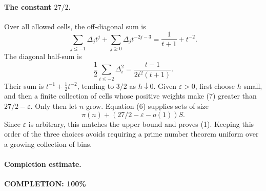 \paragraph{The constant \(27/2\).}
Over all allowed cells, the off-diagonal sum is
\[
 \sum_{j\leq-1}\Delta_j t^j+
 \sum_{j\geq0}\Delta_j t^{-2j-3}
 =\frac1{t+1}+t^{-2}.
\]
The diagonal half-sum is
\[
 \frac12\sum_{i\leq-2}\Delta_i^2
 =\frac{t-1}{2t^2(t+1)}.
\]
Their sum is \(t^{-1}+\tfrac12t^{-2}\), tending to \(3/2\)
as \(h\downarrow0\).
Given \(\varepsilon>0\), first choose \(h\) small, and
then a finite collection of cells whose positive weights
make (7) greater than \(27/2-\varepsilon\).
Only then let \(n\) grow.
Equation (6) supplies sets of size
\[
 \pi(n)+(27/2-\varepsilon-o(1))S.
\]
Since \(\varepsilon\) is arbitrary, this matches the upper
bound and proves (1). Keeping this order of the three
choices avoids requiring a prime number theorem uniform
over a growing collection of bins.

\paragraph{Completion estimate.}
\textbf{COMPLETION: 100\%}
